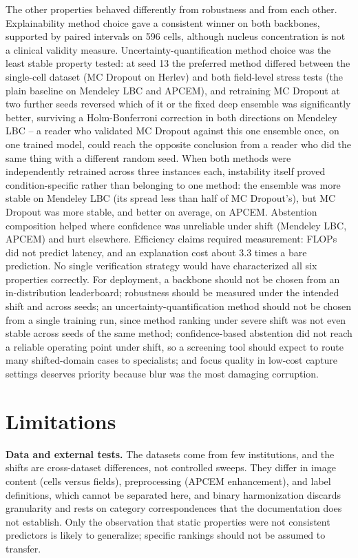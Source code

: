 \documentclass[12pt,letterpaper]{article}
\begin{document}
The other properties behaved differently from robustness and from each other. Explainability method choice gave a consistent winner on both backbones, supported by paired intervals on 596 cells, although nucleus concentration is not a clinical validity measure. Uncertainty-quantification method choice was the least stable property tested: at seed 13 the preferred method differed between the single-cell dataset (MC Dropout on Herlev) and both field-level stress tests (the plain baseline on Mendeley LBC and APCEM), and retraining MC Dropout at two further seeds reversed which of it or the fixed deep ensemble was significantly better, surviving a Holm-Bonferroni correction in both directions on Mendeley LBC -- a reader who validated MC Dropout against this one ensemble once, on one trained model, could reach the opposite conclusion from a reader who did the same thing with a different random seed. When both methods were independently retrained across three instances each, instability itself proved condition-specific rather than belonging to one method: the ensemble was more stable on Mendeley LBC (its spread less than half of MC Dropout's), but MC Dropout was more stable, and better on average, on APCEM. Abstention composition helped where confidence was unreliable under shift (Mendeley LBC, APCEM) and hurt elsewhere. Efficiency claims required measurement: FLOPs did not predict latency, and an explanation cost about 3.3 times a bare prediction. No single verification strategy would have characterized all six properties correctly. For deployment, a backbone should not be chosen from an in-distribution leaderboard; robustness should be measured under the intended shift and across seeds; an uncertainty-quantification method should not be chosen from a single training run, since method ranking under severe shift was not even stable across seeds of the same method; confidence-based abstention did not reach a reliable operating point under shift, so a screening tool should expect to route many shifted-domain cases to specialists; and focus quality in low-cost capture settings deserves priority because blur was the most damaging corruption.

\section{Limitations}
\label{sec:limitations}

\textbf{Data and external tests.} The datasets come from few institutions, and the shifts are cross-dataset differences, not controlled sweeps. They differ in image content (cells versus fields), preprocessing (APCEM enhancement), and label definitions, which cannot be separated here, and binary harmonization discards granularity and rests on category correspondences that the documentation does not establish. Only the observation that static properties were not consistent predictors is likely to generalize; specific rankings should not be assumed to transfer.
\end{document}
